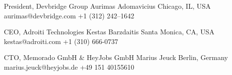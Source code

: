 

\begin{cventries}

  \cventry
    {President, Devbridge Group} %
    {Aurimas Adomavicius} %
    {Chicago, IL, USA} %
    {
      aurimas@devbridge.com\break
      +1 (312) 242–1642
    } %
    {}

  \cventry
    {CEO, Adroiti Technologies} %
    {Kestas Barzdaitis} %
    {Santa Monica, CA, USA} %
    {
      kestas@adroiti.com\break
      +1 (310) 666-0737
    } %
    {}

  \cventry
    {CTO, Memorado GmbH \& HeyJobs GmbH} %
    {Marius Jeuck} %
    {Berlin, Germany} %
    {
      marius.jeuck@heyjobs.de\break
      +49 151 40155610
    } %
    {}

\end{cventries}
